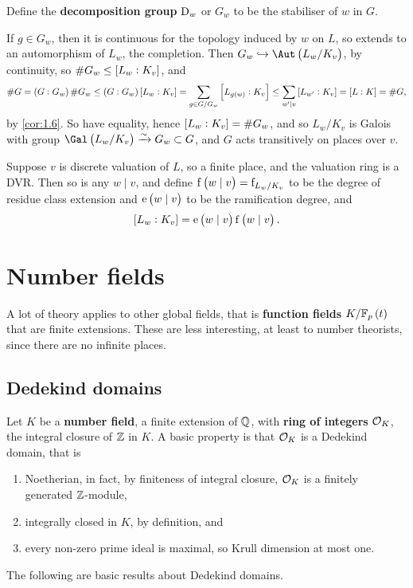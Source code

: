 \begin{definition*}
Define the \textbf{decomposition group} $ \mathrm{D}_w $ or $ G_w $ to be the stabiliser of $ w $ in $ G $.
\end{definition*}

If $ g \in G_w $, then it is continuous for the topology induced by $ w $ on $ L $, so extends to an automorphism of $ L_w $, the completion. Then $ G_w \hookrightarrow \Aut\br{L_w / K_v} $, by continuity, so $ \#G_w \le \sbr{L_w : K_v} $, and
$$ \#G = \br{G : G_w}\#G_w \le \br{G : G_w}\sbr{L_w : K_v} = \sum_{g \in G / G_w} \sbr{L_{g\br{w}} : K_v} \le \sum_{w' \mid v} \sbr{L_{w'} : K_v} = \sbr{L : K} = \#G, $$
by \ref{cor:1.6}. So have equality, hence $ \sbr{L_w : K_v} = \#G_w $, and so $ L_w / K_v $ is Galois with group $ \Gal\br{L_w / K_v} \xrightarrow{\sim} G_w \subset G $, and $ G $ acts transitively on places over $ v $.

\begin{notation*}
Suppose $ v $ is discrete valuation of $ L $, so a finite place, and the valuation ring is a DVR. Then so is any $ w \mid v $, and define $ \f\br{w \mid v} = \f_{L_w / K_v} $ to be the degree of residue class extension and $ \e\br{w \mid v} $ to be the ramification degree, and
$$ \sbr{L_w : K_v} = \e\br{w \mid v}\f\br{w \mid v}. $$
\end{notation*}

\pagebreak

\section{Number fields}

\begin{remark*}
A lot of theory applies to other global fields, that is \textbf{function fields} $ K / \FF_p\br{t} $ that are finite extensions. These are less interesting, at least to number theorists, since there are no infinite places.
\end{remark*}

\subsection{Dedekind domains}

Let $ K $ be a \textbf{number field}, a finite extension of $ \mathbb{Q} $, with \textbf{ring of integers} $ \mathcal{O}_K $, the integral closure of $ \mathbb{Z} $ in $ K $. A basic property is that $ \mathcal{O}_K $ is a Dedekind domain, that is
\begin{enumerate}
\item Noetherian, in fact, by finiteness of integral closure, $ \mathcal{O}_K $ is a finitely generated $ \mathbb{Z} $-module,
\item integrally closed in $ K $, by definition, and
\item every non-zero prime ideal is maximal, so Krull dimension at most one.
\end{enumerate}
The following are basic results about Dedekind domains.

